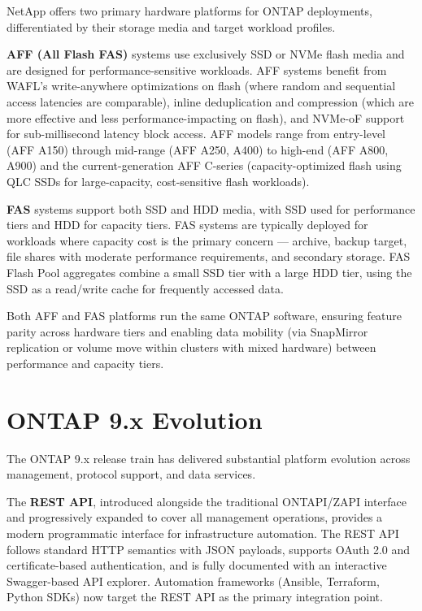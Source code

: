 NetApp offers two primary hardware platforms for ONTAP deployments, differentiated by their storage media and target workload profiles.

\textbf{AFF (All Flash FAS)} systems use exclusively SSD or NVMe flash media and are designed for performance-sensitive workloads. AFF systems benefit from WAFL's write-anywhere optimizations on flash (where random and sequential access latencies are comparable), inline deduplication and compression (which are more effective and less performance-impacting on flash), and NVMe-oF support for sub-millisecond latency block access. AFF models range from entry-level (AFF A150) through mid-range (AFF A250, A400) to high-end (AFF A800, A900) and the current-generation AFF C-series (capacity-optimized flash using QLC SSDs for large-capacity, cost-sensitive flash workloads).

\textbf{FAS} systems support both SSD and HDD media, with SSD used for performance tiers and HDD for capacity tiers. FAS systems are typically deployed for workloads where capacity cost is the primary concern --- archive, backup target, file shares with moderate performance requirements, and secondary storage. FAS Flash Pool aggregates combine a small SSD tier with a large HDD tier, using the SSD as a read/write cache for frequently accessed data.

Both AFF and FAS platforms run the same ONTAP software, ensuring feature parity across hardware tiers and enabling data mobility (via SnapMirror replication or volume move within clusters with mixed hardware) between performance and capacity tiers.

\section{ONTAP 9.x Evolution}

The ONTAP 9.x release train has delivered substantial platform evolution across management, protocol support, and data services.

The \textbf{REST API}, introduced alongside the traditional ONTAPI/ZAPI interface and progressively expanded to cover all management operations, provides a modern programmatic interface for infrastructure automation. The REST API follows standard HTTP semantics with JSON payloads, supports OAuth 2.0 and certificate-based authentication, and is fully documented with an interactive Swagger-based API explorer. Automation frameworks (Ansible, Terraform, Python SDKs) now target the REST API as the primary integration point.

